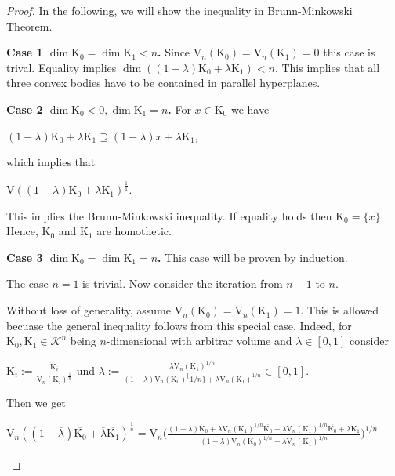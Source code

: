 \documentclass[a4paper]{book}
\numberwithin{theorem}{section}%
\begin{document}
\begin{proof}
    In the following, we will show the inequality in Brunn-Minkowski Theorem.

    \textbf{Case 1 $\dim{\mathrm{K}_{0}}=\dim{\mathrm{K}_{1}}<n$.} Since $\mathrm{V}_{n}(\mathrm{K}_{0})=\mathrm{V}_{n}(\mathrm{K}_{1})=0$ this case is trival. Equality implies $\dim((1-\lambda)\mathrm{K}_{0}+\lambda\mathrm{K}_{1})<n$. This implies that all three convex bodies have to be contained in parallel hyperplanes.\

    \textbf{Case 2 $\dim{\mathrm{K}_{0}}<0, \dim{\mathrm{K}_{1}}=n$.} For $x\in\mathrm{K}_{0}$ we have
    \begin{center}
        $(1-\lambda)\mathrm{K}_{0}+\lambda\mathrm{K}_{1}\supseteq(1-\lambda)x+\lambda\mathrm{K}_{1}$,
    \end{center}
    which implies that
    \begin{center}
        $\mathrm{V}((1-\lambda)\mathrm{K}_{0}+\lambda\mathrm{K}_{1})^{\frac{1}{1}}$.
    \end{center}
    This implies the Brunn-Minkowski inequality. If equality holds then $\mathrm{K}_{0}=\{x\}$. Hence, $\mathrm{K}_{0}$ and $\mathrm{K}_{1}$ are homothetic.

    \textbf{Case 3 $\dim{\mathrm{K}_{0}}=\dim{\mathrm{K}_{1}}=n$.} This case will be proven by induction.

    The case $n=1$ is trivial. Now consider the iteration from $n-1$ to $n$.

    Without loss of generality, assume $\mathrm{V}_{n}(\mathrm{K}_{0})=\mathrm{V}_{n}(\mathrm{K}_{1})=1$. This is allowed becuase the general inequality follows from this special case. Indeed, for $\mathrm{K}_{0},\mathrm{K}_{1}\in\mathscr{K}^{n}$ being $n$-dimensional with arbitrar volume and $\lambda\in[0,1]$ consider
    \begin{center}
        $\displaystyle \overline{\mathrm{K}_{i}}:=\frac{\mathrm{K}_{i}}{\mathrm{V}_{n}(\mathrm{K}_{i})^{\frac{1}{n}}}$ und $\displaystyle \overline{\lambda}:=\frac{\lambda\mathrm{V}_{n}(\mathrm{K}_{1})^{1/n}}{(1-\lambda)\mathrm{V}_{n}(\mathrm{K}_{0})^\{1/n\}+\lambda\mathrm{V}_{n}(\mathrm{K}_{1})^{1/n}}\in[0,1]$.
    \end{center}
    Then we get
    \begin{center}
        $\displaystyle \mathrm{V}_{n}((1-\overline{\lambda})\overline{\mathrm{K}_{0}}+\overline{\lambda}\overline{\mathrm{K}_{1}})^{\frac{1}{n}}=\mathrm{V}_{n}\Big(\frac{(1-\lambda)\mathrm{K}_{0}+\lambda\mathrm{V}_{n}(\mathrm{K}_{1})^{1/n}\overline{\mathrm{K}_{0}}-\lambda\mathrm{V}_{n}(\mathrm{K}_{1})^{1/n}\overline{\mathrm{K}_{0}}+\lambda\mathrm{K}_{1}}{(1-\lambda)\mathrm{V}_{n}(\mathrm{K}_{0})^{1/n}+\lambda\mathrm{V}_{n}(\mathrm{K}_{1})^{1/n}}\Big)^{1/n}$


\end{center}
\end{proof}
\end{document}
